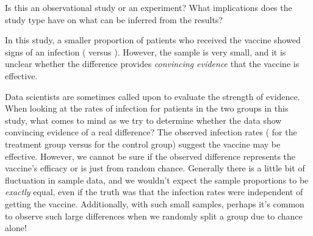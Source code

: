 \begin{exercisewrap}
\begin{nexercise}
Is this an observational study or an experiment?
What implications does the study type have on what can
be inferred from the results?\footnotemark{}
\end{nexercise}
\end{exercisewrap}

In this study, a smaller proportion of patients
who received the vaccine showed signs of an infection
(\malariaVIRPerc{} versus \malariaPIRPerc{}).
However, the sample is very small,
and it is unclear whether the difference provides
\emph{convincing evidence} that the vaccine is
effective.

\begin{examplewrap}
\begin{nexample}{Data scientists are sometimes called
    upon to evaluate the strength of evidence.
    When looking at the rates of infection for patients
    in the two groups in this study,
    what comes to mind as we try to determine whether
    the data show convincing evidence of a real difference?}
  \label{malaria_vaccine_20_what_is_convincing}
  The observed infection rates
  (\malariaVIRPerc{} for the treatment group versus
  \malariaPIRPerc{} for the control group)
  suggest the vaccine may be effective.
  However, we cannot be sure if the observed difference
  represents the vaccine's efficacy or is just from
  random chance.
  Generally there is a little bit of fluctuation
  in sample data, and we wouldn't expect the sample
  proportions to be \emph{exactly} equal,
  even if the truth was that the infection rates
  were independent of getting the vaccine.
  Additionally, with such small samples,
  perhaps it's common to observe such large differences
  when we randomly split a group due to chance alone!
\end{nexample}
\end{examplewrap}

